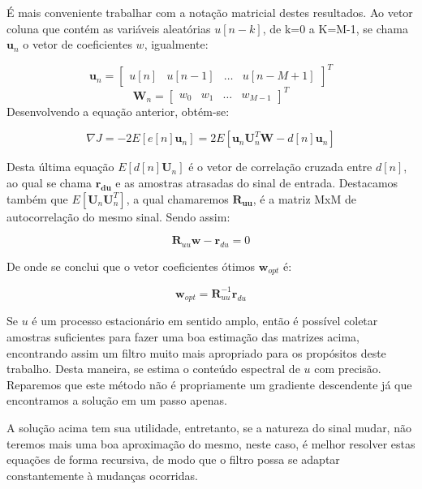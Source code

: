 \indent É mais conveniente trabalhar com a notação matricial destes resultados. Ao vetor coluna que contém as variáveis aleatórias $u[n-k]$, de k=0 a K=M-1, se chama $\boldsymbol{u}_n$ o vetor de coeficientes $w$, igualmente:

\begin{equation*}
\boldsymbol{u}_n=
\begin{bmatrix}
u[n] & u[n-1] & \dots & u[n-M+1]
\end{bmatrix}^T
\end{equation*}
\begin{equation*}
\boldsymbol{W}_n=
\begin{bmatrix}
w_0 & w_1 & \dots & w_{M-1}
\end{bmatrix}^T
\end{equation*}
Desenvolvendo a equação anterior, obtém-se:

\begin{equation}
\nabla J=-2 E[e[n]\boldsymbol{u}_n]=2E[\boldsymbol{u}_n\boldsymbol{U}^{T}_n\boldsymbol{W}-d[n]\boldsymbol{u}_n]   
\end{equation}

Desta última equação $E[d[n]\boldsymbol{U}_n]$ é o vetor de correlação cruzada entre $d[n]$, ao qual se chama $\boldsymbol{r_{du}}$ e as amostras atrasadas do sinal de entrada. Destacamos também que $E[\boldsymbol{U}_n\boldsymbol{U}^{T}_n]$, a qual chamaremos $\boldsymbol{R_{uu}}$, é a matriz MxM de autocorrelação do mesmo sinal. Sendo assim:

\begin{equation}
\boldsymbol{R}_{uu}\boldsymbol{w}-\boldsymbol{r}_{du}=0
\end{equation}

De onde se conclui que o vetor coeficientes ótimos $\boldsymbol{w}_{opt}$ é:

\begin{equation}
\boldsymbol{w}_{opt}=\boldsymbol{R}_{uu}^{-1}\boldsymbol{r}_{du}
\end{equation}

Se $u$ é um processo estacionário em sentido amplo, então é possível coletar amostras suficientes para fazer uma boa estimação das matrizes acima, encontrando assim um filtro muito mais apropriado para os propósitos deste trabalho. Desta maneira, se estima o conteúdo espectral de $u$ com precisão. Reparemos que este método não é propriamente um gradiente descendente já que encontramos a solução em um passo apenas.

\indent A solução acima tem sua utilidade, entretanto, se a natureza do sinal mudar, não teremos mais uma boa aproximação do mesmo, neste caso, é melhor resolver estas equações de forma recursiva, de modo que o filtro possa se adaptar constantemente à mudanças ocorridas.  

